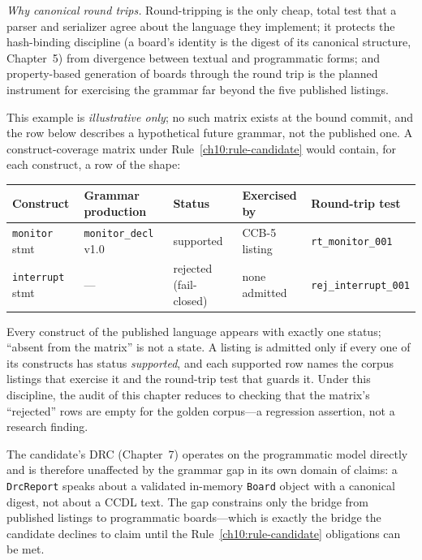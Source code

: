 \emph{Why canonical round trips.} Round-tripping is the only cheap, total test that a parser and serializer agree about the language they implement; it protects the hash-binding discipline (a board's identity is the digest of its canonical structure, Chapter~5) from divergence between textual and programmatic forms; and property-based generation of boards through the round trip \cite{quickcheck} is the planned instrument for exercising the grammar far beyond the five published listings.

\begin{example}\label{ch10:ex-matrix}
This example is \emph{illustrative only}; no such matrix exists at the bound commit, and the row below describes a hypothetical future grammar, not the published one. A construct-coverage matrix under Rule~\ref{ch10:rule-candidate} would contain, for each construct, a row of the shape:

\begin{center}
\small
\begin{tabular}{@{}lllll@{}}
\toprule
Construct & Grammar production & Status & Exercised by & Round-trip test \\
\midrule
\texttt{monitor} stmt & \texttt{monitor\_decl} v1.0 & supported & CCB-5 listing & \texttt{rt\_monitor\_001} \\
\texttt{interrupt} stmt & --- & rejected (fail-closed) & none admitted & \texttt{rej\_interrupt\_001} \\
\bottomrule
\end{tabular}
\end{center}

Every construct of the published language appears with exactly one status; ``absent from the matrix'' is not a state. A listing is admitted only if every one of its constructs has status \emph{supported}, and each supported row names the corpus listings that exercise it and the round-trip test that guards it. Under this discipline, the audit of this chapter reduces to checking that the matrix's ``rejected'' rows are empty for the golden corpus---a regression assertion, not a research finding.
\end{example}

\begin{remark}\label{ch10:relation-drc}
The candidate's DRC (Chapter~7) operates on the programmatic model directly and is therefore unaffected by the grammar gap in its own domain of claims: a \texttt{DrcReport} speaks about a validated in-memory \texttt{Board} object with a canonical digest, not about a CCDL text. The gap constrains only the bridge from published listings to programmatic boards---which is exactly the bridge the candidate declines to claim until the Rule~\ref{ch10:rule-candidate} obligations can be met.
\end{remark}

